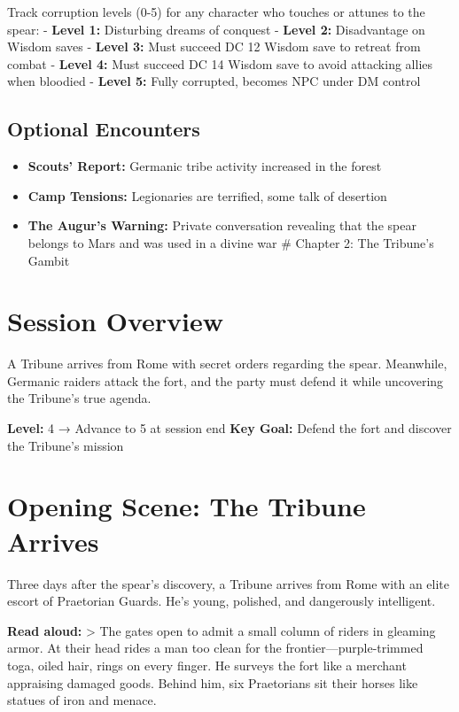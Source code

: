 \documentclass[
]{book}
\providecommand{\tightlist}{%
  \setlength{\itemsep}{0pt}\setlength{\parskip}{0pt}}
\begin{document}
Track corruption levels (0-5) for any character who touches or attunes
to the spear: - \textbf{Level 1:} Disturbing dreams of conquest -
\textbf{Level 2:} Disadvantage on Wisdom saves - \textbf{Level 3:} Must
succeed DC 12 Wisdom save to retreat from combat - \textbf{Level 4:}
Must succeed DC 14 Wisdom save to avoid attacking allies when bloodied -
\textbf{Level 5:} Fully corrupted, becomes NPC under DM control

\subsection{Optional Encounters}\label{optional-encounters}

\begin{itemize}
\tightlist
\item
  \textbf{Scouts' Report:} Germanic tribe activity increased in the
  forest
\item
  \textbf{Camp Tensions:} Legionaries are terrified, some talk of
  desertion
\item
  \textbf{The Augur's Warning:} Private conversation revealing that the
  spear belongs to Mars and was used in a divine war \# Chapter 2: The
  Tribune's Gambit
\end{itemize}

\section{Session Overview}\label{session-overview-1}

A Tribune arrives from Rome with secret orders regarding the spear.
Meanwhile, Germanic raiders attack the fort, and the party must defend
it while uncovering the Tribune's true agenda.

\textbf{Level:} 4 → Advance to 5 at session end \textbf{Key Goal:}
Defend the fort and discover the Tribune's mission

\section{Opening Scene: The Tribune
Arrives}\label{opening-scene-the-tribune-arrives}

Three days after the spear's discovery, a Tribune arrives from Rome with
an elite escort of Praetorian Guards. He's young, polished, and
dangerously intelligent.

\textbf{Read aloud:} \textgreater{} The gates open to admit a small
column of riders in gleaming armor. At their head rides a man too clean
for the frontier---purple-trimmed toga, oiled hair, rings on every
finger. He surveys the fort like a merchant appraising damaged goods.
Behind him, six Praetorians sit their horses like statues of iron and
menace.
\end{document}
